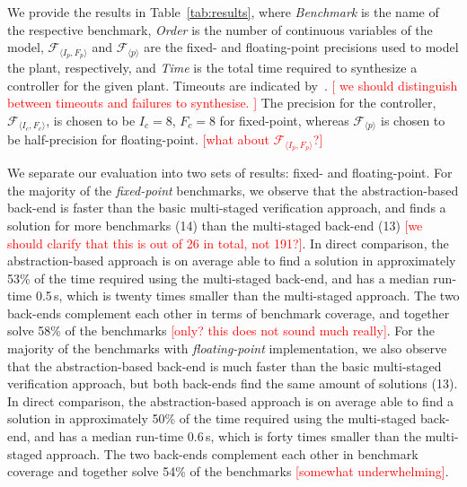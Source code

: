 \documentclass[twocolumn]{autart}    %
\newcommand{\xmark}{\ding{55}}
\renewcommand{\note}[1]{\textcolor{red}{[#1]}}
\begin{document}
We provide the results in Table~\ref{tab:results}, 
where \textit{Benchmark} is the name of the respective benchmark, 
\textit{Order} is the number of continuous variables of the model, 
$\mathcal{F}_{\langle I_p,F_p \rangle}$ and $\mathcal{F}_{\langle p \rangle}$  
are the fixed- and floating-point precisions used to model the plant, respectively,  
and \textit{Time} is the total time required to synthesize a controller for the given plant.    
Timeouts are indicated by~\xmark.  \note{ we should distinguish between timeouts and failures to synthesise. }
The precision for the controller, $\mathcal{F}_{\langle I_c,F_c \rangle}$, is
chosen to be $I_c = 8$, $F_c = 8$ for fixed-point, whereas  
$\mathcal{F}_{\langle p \rangle}$ is chosen to be half-precision for floating-point. \note{what about $\mathcal{F}_{\langle I_p,F_p \rangle}$?}

We separate our evaluation into two sets of results: fixed- and floating-point. 
For the majority of the {\it fixed-point} benchmarks, we observe that the abstraction-based
back-end is faster than the basic multi-staged verification approach, and
finds a solution for more benchmarks (14) than the multi-staged back-end (13) \note{we should clarify that this is out of 26 in total, not 191?}.  
In direct comparison, the abstraction-based approach is on average able to find a
solution in approximately 53\% of the time required using the multi-staged
back-end, and has a median run-time 0.5\,s, which is twenty times smaller
than the multi-staged approach.  The two back-ends complement each other in terms of 
benchmark coverage, and together solve 58\% of the benchmarks \note{only? this does not sound much really}.  
%
For the majority of the benchmarks with {\it floating-point} implementation, 
we also observe that the abstraction-based back-end is much faster than the basic multi-staged verification approach, 
but both back-ends find the same amount of solutions (13).  
In direct comparison, the abstraction-based approach is on average able to find a
solution in approximately 50\% of the time required using the multi-staged
back-end, and has a median run-time 0.6\,s, which is forty times smaller
than the multi-staged approach.  The two back-ends complement each other in
benchmark coverage and together solve 54\% of the benchmarks \note{somewhat underwhelming}.
\end{document}
